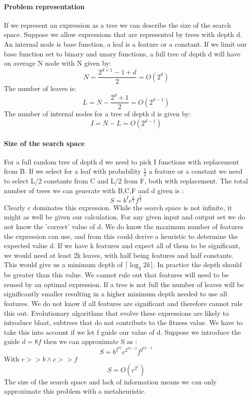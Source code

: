 \paragraph{Problem representation}
If we represent an expression as a tree we can describe the size of the search space. Suppose we allow expressions that are represented by trees with depth d. An internal node is base function, a leaf is a feature or a constant. If we limit our base function set to binary and unary functions, a full tree of depth d will have on average N node with N given by:
\[
N = \frac{2^{d+1} - 1 + d}{2} = O(2^d)
\]
The number of leaves is:
\[
L = N - \frac{2^{d} + 1}{2} = O(2^{d-1})
\]
The number of internal nodes for a tree of depth d is given by:
\[
I = N - L = O(2^{d-1})
\]
\paragraph{Size of the search space}\label{searchspace}
For a full random tree of depth d we need to pick I functions with replacement from B.
If we select for a leaf with probability $\frac{1}{2}$ a feature or a constant we need to select L/2 constants from C and L/2 from F, both with replacement.
The total number of trees we can generate with B,C,F and d given is :
\[
S = b^I c^{\frac{L}{2}} f^{\frac{L}{2}}
\]
Clearly c dominates this expression. While the search space is not infinite, it might as well be given our calculation. For any given input and output set we do not know the 'correct' value of d. We do know the maximum number of features the expression can use, and from this could derive a heuristic to determine the expected value d. If we have k features and expect all of them to be significant, we would need at least 2k leaves, with half being features and half constants. This would give us a minimum depth of $\lceil \log_2{2k} \rceil$. In practice the depth should be greater than this value. We cannot rule out that features will need to be reused by an optimal expression. If a tree is not full the number of leaves will be significantly smaller resulting in a higher minimum depth needed to use all features. We do not know if all features are significant and therefore cannot rule this out. Evolutionary algorithms that evolve these expressions are likely to introduce bloat, subtrees that do not contribute to the fitness value. We have to take this into account if we let f guide our value of d. Suppose we introduce the guide $d = 8 f$ then we can approximate S as :
\[
S = b^{2^{8f}} c^{2^{8f-2}} f^{2^{8f-2}}
\]
With $ c >> b \land c >> f $
\[
S = O(c^{2^f})
\]
The size of the search space and lack of information means we can only approximate this problem with a metaheuristic.

